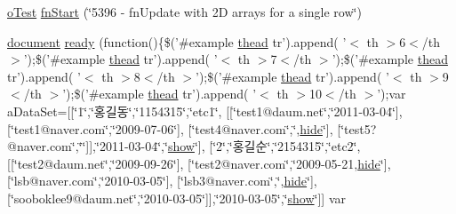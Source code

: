 \begin{DoxyCompactItemize}
\item 
\hyperlink{unit__test_8js_a3b2d259e2df3b6860d9047a92d09d0d6}{o\+Test} \hyperlink{5396-fn_update-arrays-m_data_8js_a37e375a447ea6f3086d4aaff03f3450a}{fn\+Start} (\char`\"{}5396 -\/ fn\+Update with 2\+D arrays for a single row\char`\"{})
\item 
\hyperlink{outside_events_8js_aa14f8e0338cced6720590fd2ea13bd4b}{document} \hyperlink{5396-fn_update-arrays-m_data_8js_ac30981da08e35b1561cb120c882757ca}{ready} (function()\{\$('\#example \hyperlink{core_8constructor_8js_a856be760b6816c9591ce69f0a2b43693}{thead} tr').append( '$<$ th $>$6$<$/th $>$');\$('\#example \hyperlink{core_8constructor_8js_a856be760b6816c9591ce69f0a2b43693}{thead} tr').append( '$<$ th $>$7$<$/th $>$');\$('\#example \hyperlink{core_8constructor_8js_a856be760b6816c9591ce69f0a2b43693}{thead} tr').append( '$<$ th $>$8$<$/th $>$');\$('\#example \hyperlink{core_8constructor_8js_a856be760b6816c9591ce69f0a2b43693}{thead} tr').append( '$<$ th $>$9$<$/th $>$');\$('\#example \hyperlink{core_8constructor_8js_a856be760b6816c9591ce69f0a2b43693}{thead} tr').append( '$<$ th $>$10$<$/th $>$');var a\+Data\+Set=\mbox{[}\mbox{[}\char`\"{}1\char`\"{},\char`\"{}홍길동\char`\"{},\char`\"{}1154315\char`\"{},\char`\"{}etc1\char`\"{}, \mbox{[}\mbox{[}\char`\"{}test1@daum.\+net\char`\"{},\char`\"{}2011-\/03-\/04\char`\"{}\mbox{]}, \mbox{[}\char`\"{}test1@naver.\+com\char`\"{},\char`\"{}2009-\/07-\/06\char`\"{}\mbox{]}, \mbox{[}\char`\"{}test4@naver.\+com\char`\"{},\char`\"{},\hyperlink{jquery_8tooltip_8js_af74dd80504a76d14389d6c8c02f3aa0e}{hide}\char`\"{}\mbox{]}, \mbox{[}\char`\"{}test5?@naver.\+com\char`\"{},\char`\"{}\char`\"{}\mbox{]}\mbox{]},\char`\"{}2011-\/03-\/04\char`\"{},\char`\"{}\hyperlink{jquery_8tooltip_8js_aa8d9f2083cafa2af98efafed94901079}{show}\char`\"{}\mbox{]}, \mbox{[}\char`\"{}2\char`\"{},\char`\"{}홍길순\char`\"{},\char`\"{}2154315\char`\"{},\char`\"{}etc2\char`\"{}, \mbox{[}\mbox{[}\char`\"{}test2@daum.\+net\char`\"{},\char`\"{}2009-\/09-\/26\char`\"{}\mbox{]}, \mbox{[}\char`\"{}test2@naver.\+com\char`\"{},\char`\"{}2009-\/05-\/21,\hyperlink{jquery_8tooltip_8js_af74dd80504a76d14389d6c8c02f3aa0e}{hide}\char`\"{}\mbox{]}, \mbox{[}\char`\"{}lsb@naver.\+com\char`\"{},\char`\"{}2010-\/03-\/05\char`\"{}\mbox{]}, \mbox{[}\char`\"{}lsb3@naver.\+com\char`\"{},\char`\"{},\hyperlink{jquery_8tooltip_8js_af74dd80504a76d14389d6c8c02f3aa0e}{hide}\char`\"{}\mbox{]}, \mbox{[}\char`\"{}sooboklee9@daum.\+net\char`\"{},\char`\"{}2010-\/03-\/05\char`\"{}\mbox{]}\mbox{]},\char`\"{}2010-\/03-\/05\char`\"{},\char`\"{}\hyperlink{jquery_8tooltip_8js_aa8d9f2083cafa2af98efafed94901079}{show}\char`\"{}\mbox{]}\mbox{]} var 
\end{DoxyCompactItemize}
